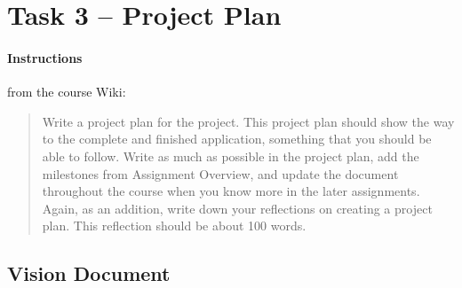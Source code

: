 %
%
%
%


\section{Task 3 -- Project Plan}\label{task-3}

\paragraph{Instructions}\label{task-3-instructions}
from the course Wiki\cite{1dv600:lab1:instructions}:

\begin{quote}
  Write a project plan for the project. This project plan should show the way
  to the complete and finished application, something that you should be able
  to follow. Write as much as possible in the project plan, add the
  milestones from Assignment Overview, and update the document throughout the
  course when you know more in the later assignments.  Again, as an addition,
  write down your reflections on creating a project plan. This reflection
  should be about 100 words.
\end{quote}


\subsection{Vision Document}\label{task-3-project-plan}
